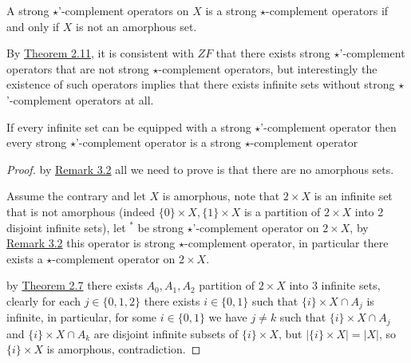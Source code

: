 	
	\begin{remark}\label{rem:3.2}
		A strong $\star$'-complement operators on $X$ is a strong $\star$-complement operators if and only if $X$ is not an amorphous set.
	\end{remark}

	By \hyperref[thm:2.11]{Theorem 2.11}, it is consistent with $ZF$ that there exists strong $\star$'-complement operators that are not strong $\star$-complement operators, but interestingly the existence of such operators implies that there exists infinite sets without strong $\star$'-complement operators at all.
	
	\begin{theorem}\label{thm:3.3}
		If every infinite set can be equipped with a strong $\star$'-complement operator then every strong $\star$'-complement operator is a strong $\star$-complement operator
	\end{theorem}
	\begin{proof}
		by \hyperref[rem:3.2]{Remark 3.2} all we need to prove is that there are no amorphous sets.
		
		Assume the contrary and let $X$ is amorphous, note that $2\times X$ is an infinite set that is not amorphous (indeed $\{0\}\times X, \{1\}\times X$ is a partition of $2\times X$ into 2 disjoint infinite sets), let $^*$ be strong $\star$'-complement operator on $2\times X$, by \hyperref[rem:3.2]{Remark 3.2} this operator is strong $\star$-complement operator, in particular there exists a $\star$-complement operator on $2\times X$.
		
		by \hyperref[thm:2.7]{Theorem 2.7} there exists $A_0,A_1,A_2$ partition of $2\times X$ into $3$ infinite sets, clearly for each $j\in\{0,1,2\}$ there exists $i\in\{0,1\}$ such that $\{i\}\times X\cap A_j$ is infinite, in particular, for some $i\in\{0,1\}$ we have $j\ne k$ such that $\{i\}\times X\cap A_j$ and $\{i\}\times X\cap A_k$ are disjoint infinite subsets of $\{i\}\times X$, but $|\{i\}\times X|=|X|$, so $\{i\}\times X$ is amorphous, contradiction.
	\end{proof}
	
